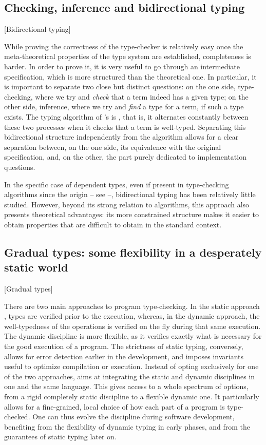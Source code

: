 \subsection{Checking, inference and bidirectional typing}[Bidirectional typing]

While proving the correctness of the type-checker is relatively easy once the
meta-theoretical properties of the type system are established, completeness is harder.
In order to prove it, it is very useful to go through an intermediate specification,
which is more structured than the theoretical one.
In particular, it is important to separate two close but distinct questions:
on the one side, type-checking, where we try and \emph{check} that a term indeed has a
given type;
on the other side, inference, where we try and \emph{find} a type for a term, if such a
type exists.
The typing algorithm of 's  is , that is, it
alternates constantly between these two processes when it checks that a term is well-typed.
Separating this bidirectional structure independently from the algorithm allows for a
clear separation between, on the one side, its equivalence with the original specification,
and, on the other, the part purely dedicated to implementation questions.

In the specific case of dependent types, even if present in type-checking algorithms since
the origin – see \eg {} –, bidirectional typing has been relatively little
studied. However, beyond its strong relation to algorithms, this approach also presents
theoretical advantages: its more constrained structure makes it easier
to obtain properties that are difficult to obtain in the standard context.

\subsection{Gradual types: some flexibility in a desperately static world}
  [Gradual types]
\label{sec:intro-graduel-en}

There are two main approaches to program type-checking. In the static approach%
,
types are verified prior to the execution, whereas, in the dynamic approach, the well-typedness
of the operations is verified on the fly during that same execution.
The dynamic discipline is more flexible, as it verifies exactly what is necessary
for the good execution of a program.
The strictness of static typing, conversely, allows for error detection earlier in the
development, and imposes invariants useful to optimize compilation or execution.
Instead of opting exclusively for one of the two approaches,
  aims at integrating
the static and dynamic disciplines in one and the
same language. This gives access to a whole spectrum of options, from a rigid completely static
discipline to a flexible dynamic one. It particularly allows for a fine-grained, local choice
of how each part of a program is type-checked.
One can thus evolve the discipline during software development, benefiting from
the flexibility of dynamic typing in early phases, and from the guarantees of static typing
later on.

